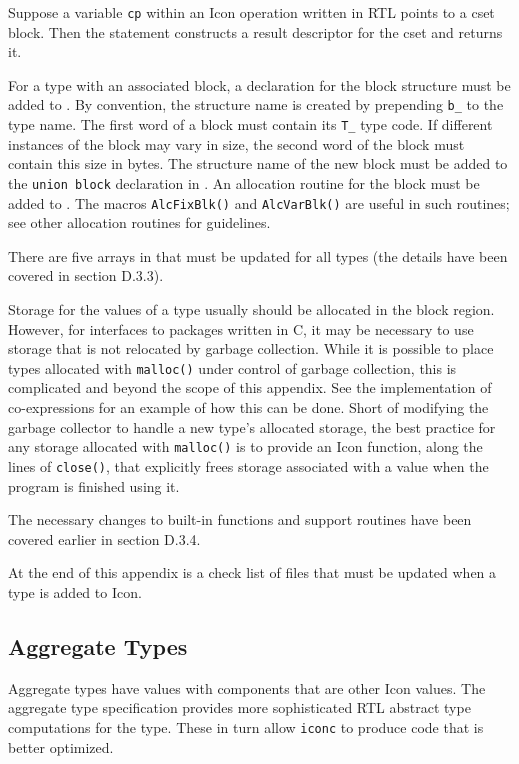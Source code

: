 \noindent
Suppose a variable \texttt{cp} within an Icon operation written in RTL
points to a cset block. Then the statement
\noindent
constructs a result descriptor for the cset and returns it.

For a type with an associated block, a declaration for the block
structure must be added to . By convention, the
structure name is created by prepending \texttt{b\_} to the type name.
The first word of a block must contain its \texttt{T\_} type code. If
different instances of the block may vary in size, the second word of
the block must contain this size in bytes. The structure name of the
new block must be added to the \texttt{union block} declaration
in . An allocation routine for the block must be
added to . The macros \texttt{AlcFixBlk()} and
\texttt{AlcVarBlk()} are useful in such routines; see other allocation
routines for guidelines.


There are five arrays in  that must be
updated for all types (the details have been covered in section D.3.3).

Storage for the values of a type usually should be allocated in the
block region. However, for interfaces to packages written in C, it may
be necessary to use storage that is not relocated by garbage
collection. While it is possible to place types allocated with
\texttt{malloc()} under control of garbage collection, this is
complicated and beyond the scope of this appendix. See the
implementation of co-expressions for an example of how this can be
done. Short of modifying the garbage collector to handle a new type's
allocated storage, the best practice for any storage allocated with
\texttt{malloc()} is to provide an Icon function, along the lines of
\texttt{close()}, that explicitly frees storage associated with a
value when the program is finished using it.

The necessary changes to built-in functions and support routines have
been covered earlier in section D.3.4.

At the end of this appendix is a check list of files that must be
updated when a type is added to Icon.

\subsection{Aggregate Types}

Aggregate types have values with components that are other Icon values.
The aggregate type specification provides more sophisticated RTL abstract
type computations for the type. These in turn allow \texttt{iconc} to
produce code that is better optimized.

